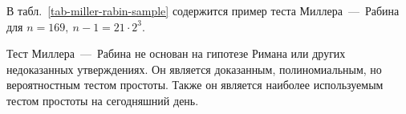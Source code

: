 \example
В табл.~\ref{tab-miller-rabin-sample} содержится пример теста Миллера~---~Рабина для $n = 169, ~ n-1 = 21 \cdot 2^3$.
\begin{table}[!ht]
    \centering
    \caption{Пример теста Миллера~---~Рабина для $n = 169$ и четырех оснований $a$: 19, 22, 23, 2\label{tab-miller-rabin-sample}}
\end{table}
\exampleend

Тест Миллера~---~Рабина не основан на гипотезе Римана или других недоказанных утверждениях. Он является доказанным, полиномиальным, но вероятностным тестом простоты. Также он является наиболее используемым тестом простоты на сегодняшний день.

